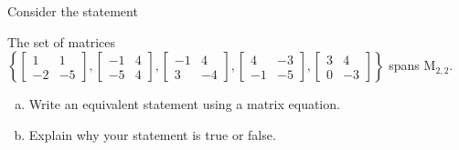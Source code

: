
\begin{exerciseStatement}


Consider the statement 
\begin{center}\begin{minipage}{0.8\textwidth}
 The set of matrices \( \left\{ \left[\begin{array}{cc}
1 & 1 \\
-2 & -5
\end{array}\right] , \left[\begin{array}{cc}
-1 & 4 \\
-5 & 4
\end{array}\right] , \left[\begin{array}{cc}
-1 & 4 \\
3 & -4
\end{array}\right] , \left[\begin{array}{cc}
4 & -3 \\
-1 & -5
\end{array}\right] , \left[\begin{array}{cc}
3 & 4 \\
0 & -3
\end{array}\right] \right\} \) spans \(\mathrm{M}_{2,2}\). 
\end{minipage}\end{center}
    


\begin{enumerate}[(a)]
\item  Write an equivalent statement using a matrix equation.
\item  Explain why your statement is true or false.
\end{enumerate}
    
\end{exerciseStatement}
    
